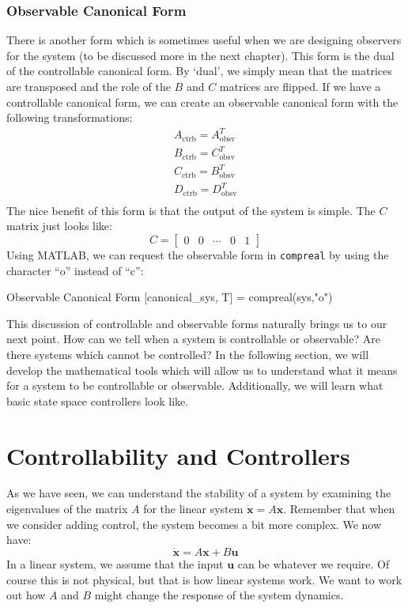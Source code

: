 \subsubsection{Observable Canonical Form}
There is another form which is sometimes useful when we are designing observers for the system (to be discussed more in the next chapter). This form is the dual of the controllable canonical form. By `dual', we simply mean that the matrices are transposed and the role of the $B$ and $C$ matrices are flipped. If we have a controllable canonical form, we can create an observable canonical form with the following transformations:
\begin{gather}
A_\text{ctrb}=A_\text{obsv}^T\\
B_\text{ctrb}=C_\text{obsv}^T\\
C_\text{ctrb}=B_\text{obsv}^T\\
D_\text{ctrb}=D_\text{obsv}^T\\
\end{gather}
The nice benefit of this form is that the output of the system is simple. The $C$ matrix just looks like:
$$C=\begin{bmatrix}
    0&0&\cdots&0&1
\end{bmatrix}$$
Using MATLAB, we can request the observable form in \texttt{compreal} by using the character ``o'' instead of ``c'':
\begin{matlabscript}{Observable Canonical Form}
[canonical_sys, T] = compreal(sys,"o")
\end{matlabscript}

This discussion of controllable and observable forms naturally brings us to our next point. How can we tell when a system is controllable or observable? Are there systems which cannot be controlled? In the following section, we will develop the mathematical tools which will allow us to understand what it means for a system to be controllable or observable. Additionally, we will learn what basic state space controllers look like.

\section{Controllability and Controllers}
As we have seen, we can understand the stability of a system by examining the eigenvalues of the matrix $A$ for the linear system $\bm{\dot{x}}=A\bm{x}$. Remember that when we consider adding control, the system becomes a bit more complex. We now have:
$$\bm{\dot{x}}=A\bm{x}+B\bm{u}$$
In a linear system, we assume that the input $\bm{u}$ can be whatever we require. Of course this is not physical, but that is how linear systems work. We want to work out how $A$ and $B$ might change the response of the system dynamics. 

